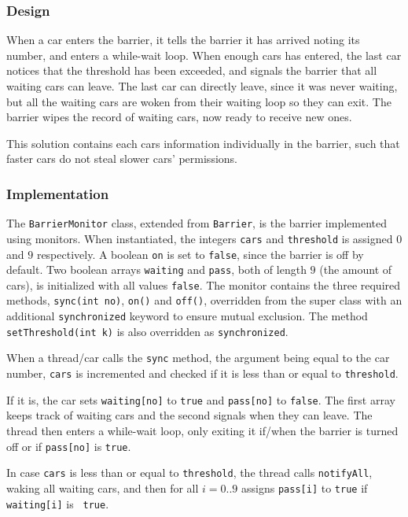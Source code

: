 \subsubsection{Design}
When a car enters the barrier, it tells the barrier it has arrived noting its number, and enters a while-wait loop. When enough cars has entered, the last car notices that the threshold has been exceeded, and signals the barrier that all waiting cars can leave. The last car can directly leave, since it was never waiting, but all the waiting cars are woken from their waiting loop so they can exit. The barrier wipes the record of waiting cars, now ready to receive new ones.

This solution contains each cars information individually in the barrier, such that faster cars do not steal slower cars' permissions.

\subsubsection{Implementation}
The \texttt{BarrierMonitor} class, extended from \texttt{Barrier}, is the barrier implemented using monitors. When instantiated, the integers \texttt{cars} and \texttt{threshold} is assigned $0$ and $9$ respectively. A boolean \texttt{on} is set to \texttt{false}, since the barrier is off by default. Two boolean arrays \texttt{waiting} and \texttt{pass}, both of length $9$ (the amount of cars), is initialized with all values \texttt{false}. The monitor contains the three required methods, \texttt{sync(int no)}, \texttt{on()} and \texttt{off()}, overridden from the super class with an additional \texttt{synchronized} keyword to ensure mutual exclusion. The method \texttt{setThreshold(int k)} is also overridden as \texttt{synchronized}.

When a thread/car calls the \texttt{sync} method, the argument being equal to the car number, \texttt{cars} is incremented and checked if it is less than or equal to \texttt{threshold}.

If it is, the car sets \texttt{waiting[no]} to \texttt{true} and \texttt{pass[no]} to \texttt{false}. The first array keeps track of waiting cars and the second signals when they can leave. The thread then enters a while-wait loop, only exiting it if/when the barrier is turned off or if \texttt{pass[no]} is \texttt{true}.

In case \texttt{cars} is less than or equal to \texttt{threshold}, the thread calls \texttt{notifyAll}, waking all waiting cars, and then for all $i=0..9$ assigns \texttt{pass[i]} to \texttt{true} if \texttt{waiting[i]} is \texttt{ true}.

